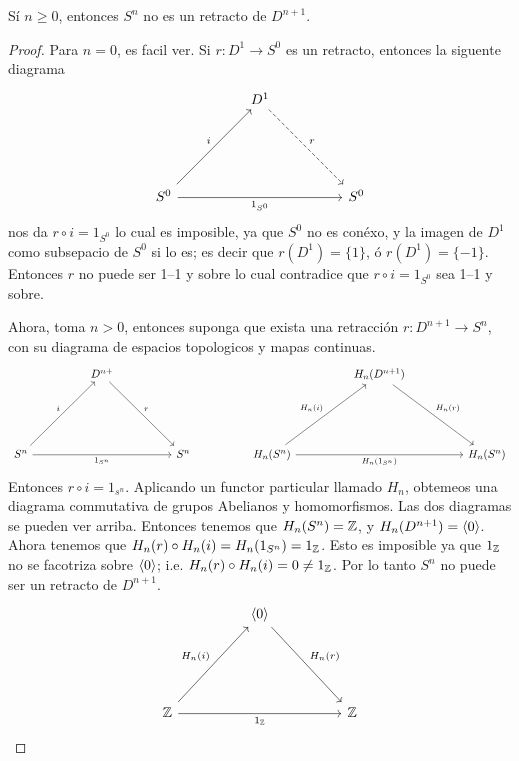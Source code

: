 \begin{lemma}\label{lemma_2.2}
    S\'i $n \geq 0$, entonces  $S^n$ no es un retracto de  $D^{n+1}$.
\end{lemma}
\begin{proof}
    Para $n=0$, es facil ver. Si  $r:D^1 \rightarrow S^0$ es un retracto,
    entonces la siguente diagrama
    \[\begin{tikzcd}
	&& {D^1} \\
	\\
	\\
	{S^0} &&&& {S^0}
	\arrow["i", from=4-1, to=1-3]
	\arrow["{1_{S^0}}"', from=4-1, to=4-5]
	\arrow["r", dashed, from=1-3, to=4-5]
\end{tikzcd}\]
nos da $r \circ i=1_{S^0}$ lo cual es imposible, ya que $S^0$ no es con\'exo, y
la imagen de  $D^1$ como subsepacio de  $S^0$ si lo es; es decir que
$r(D^1)=\{1\}$, \'o $r(D^1)=\{-1\}$. Entonces $r$ no puede ser  1--1 y sobre lo
cual contradice que  $r \circ i=1_{S^0}$ sea 1--1 y sobre.

Ahora, toma $n>0$, entonces suponga que exista una retracci\'on  $r:D^{n+1}
\rightarrow S^n$, con su diagrama de espacios topologicos y mapas continuas.
\[\begin{tikzcd}
	&& {D^{n+}} &&&&&& {H_n(D^{n+1})} \\
	\\
	\\
	{S^n} &&&& {S^n} && {H_n(S^n)} &&&& {H_n(S^n)}
	\arrow["i", from=4-1, to=1-3]
	\arrow["r", from=1-3, to=4-5]
	\arrow["{1_{S^n}}"', from=4-1, to=4-5]
	\arrow["{H_n(i)}", from=4-7, to=1-9]
	\arrow["{H_n(r)}", from=1-9, to=4-11]
	\arrow["{H_n(1_{S^n})}"', from=4-7, to=4-11]
\end{tikzcd}\]
Entonces $r \circ i=1_{s^n}$. Aplicando un functor particular llamado $H_n$,
obtemeos una diagrama commutativa de grupos Abelianos y homomorfismos. Las dos
diagramas se pueden ver arriba. Entonces tenemos que $H_n(S^n)=\mathbb{Z}$, y
$H_n(D^{n+1})=\langle 0\rangle$. Ahora tenemos que $H_n(r) \circ
H_n(i)=H_n(1_{S^n})=1_{\mathbb{Z}}$. Esto es imposible ya que $1_{\mathbb{Z}}$ no se facotriza sobre
$\langle 0\rangle$; i.e. $H_n(r) \circ H_n(i)=0 \ne 1_{\mathbb{Z}}$. Por lo tanto $S^n$ no
puede ser un retracto de  $D^{n+1}$.
\[\begin{tikzcd}
	&& \langle0\rangle \\
	\\
	\\
	\Z &&&& \Z
	\arrow["{H_n(i)}", from=4-1, to=1-3]
	\arrow["{H_n(r)}", from=1-3, to=4-5]
	\arrow["{1_\Z}"', from=4-1, to=4-5]
\end{tikzcd}\]
\end{proof}

